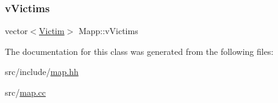 \subsubsection{\texorpdfstring{vVictims}{vVictims}}
{\footnotesize\ttfamily vector$<$\mbox{\hyperlink{class_victim}{Victim}}$>$ Mapp\+::v\+Victims\hspace{0.3cm}{\ttfamily [protected]}}



The documentation for this class was generated from the following files\+:\begin{DoxyCompactItemize}
\item 
src/include/\mbox{\hyperlink{map_8hh}{map.\+hh}}\item 
src/\mbox{\hyperlink{map_8cc}{map.\+cc}}\end{DoxyCompactItemize}
